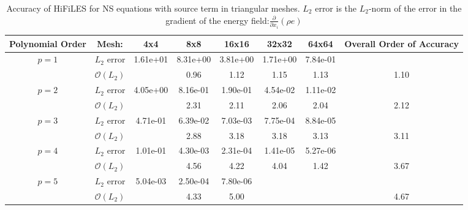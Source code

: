 \begin{table}[H]
\centering
\begin{tabular}{ c c c c c c c c} 
  
 Polynomial Order & Mesh: & 4x4 & 8x8 & 16x16 & 32x32 & 64x64 & Overall Order of Accuracy \\ 
 \hline 
 \multirow{2}{*}{$p = 1$} & $L_2$ error & 1.61e+01 & 8.31e+00 & 3.81e+00 & 1.71e+00 & 7.84e-01 &   \\ 
  
   & $\mathcal{O}(L_2)$ &   & 0.96 & 1.12 & 1.15 & 1.13 & 1.10 \\ 
 \hline 
 \multirow{2}{*}{$p = 2$} & $L_2$ error & 4.05e+00 & 8.16e-01 & 1.90e-01 & 4.54e-02 & 1.11e-02 &   \\ 
  
   & $\mathcal{O}(L_2)$ &   & 2.31 & 2.11 & 2.06 & 2.04 & 2.12 \\ 
 \hline 
 \multirow{2}{*}{$p = 3$} & $L_2$ error & 4.71e-01 & 6.39e-02 & 7.03e-03 & 7.75e-04 & 8.84e-05 &   \\ 
  
   & $\mathcal{O}(L_2)$ &   & 2.88 & 3.18 & 3.18 & 3.13 & 3.11 \\ 
 \hline 
 \multirow{2}{*}{$p = 4$} & $L_2$ error & 1.01e-01 & 4.30e-03 & 2.31e-04 & 1.41e-05 & 5.27e-06 &   \\ 
  
   & $\mathcal{O}(L_2)$ &   & 4.56 & 4.22 & 4.04 & 1.42 & 3.67 \\ 
 \hline 
 \multirow{2}{*}{$p = 5$} & $L_2$ error & 5.04e-03 & 2.50e-04 & 7.80e-06 &   &   &   \\ 
  
   & $\mathcal{O}(L_2)$ &   & 4.33 & 5.00 &   &   & 4.67 \\ 
 \hline 
 \end{tabular}
\caption{Accuracy of HiFiLES for NS equations with source term in triangular meshes. $L_2$ error is the $L_2$-norm of the error in the gradient of the energy field:$\frac{\partial}{\partial x_i} (\rho e)$}
\label{table:trisError2} 
 \end{table}
